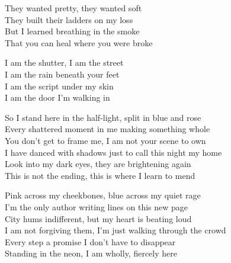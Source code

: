 \begin{lyrics}
They wanted pretty, they wanted soft\\
They built their ladders on my loss\\
But I learned breathing in the smoke\\
That you can heal where you were broke

I am the shutter, I am the street\\
I am the rain beneath your feet\\
I am the script under my skin\\
I am the door I’m walking in

So I stand here in the half-light, split in blue and rose\\
Every shattered moment in me making something whole\\
You don’t get to frame me, I am not your scene to own\\
I have danced with shadows just to call this night my home\\
Look into my dark eyes, they are brightening again\\
This is not the ending, this is where I learn to mend

Pink across my cheekbones, blue across my quiet rage\\
I’m the only author writing lines on this new page\\
City hums indifferent, but my heart is beating loud\\
I am not forgiving them, I’m just walking through the crowd\\
Every step a promise I don’t have to disappear\\
Standing in the neon, I am wholly, fiercely here
\end{lyrics}

